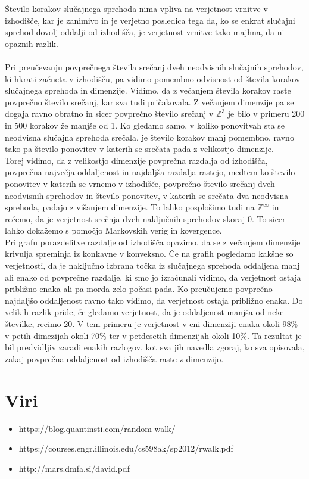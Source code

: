\documentclass[a4paper,oneside,12pt]{article}
\begin{document}
Število korakov slučajnega sprehoda nima vpliva na verjetnost vrnitve v izhodišče, kar je zanimivo in je verjetno posledica tega da, ko se enkrat slučajni sprehod dovolj oddalji od izhodišča, je verjetnost vrnitve tako majhna, da ni opaznih razlik. \\
\\
Pri preučevanju povprečnega števila srečanj dveh neodvisnih slučajnih sprehodov, ki hkrati začneta v izhodišču, pa vidimo pomembno odvisnost od števila korakov slučajnega sprehoda in dimenzije. Vidimo, da z večanjem števila korakov raste povprečno število srečanj, kar sva tudi pričakovala. Z večanjem dimenzije pa se dogaja ravno obratno in sicer povprečno število srečanj v $\mathbb{Z}^3$ je bilo v primeru 200 in 500 korakov že manjše od 1. Ko gledamo samo, v koliko ponovitvah sta se neodvisna slučajna sprehoda srečala, je število korakov manj pomembno, ravno tako pa število ponovitev v katerih se srečata pada z velikostjo dimenzije. \\
Torej vidimo, da z velikostjo dimenzije povprečna razdalja od izhodišča, povprečna največja oddaljenost in najdaljša razdalja rastejo, medtem ko število ponovitev v katerih se vrnemo v izhodišče, povprečno število srečanj dveh neodvisnih sprehodov in število ponovitev, v katerih se srečata dva neodvisna sprehoda, padajo z višanjem dimenzije. To lahko posplošimo tudi na $\mathbb{Z}^\infty$ in rečemo, da je verjetnost srečnja dveh naključnih sprehodov skoraj 0. To sicer lahko dokažemo s pomočjo Markovskih verig in kovergence. \\


Pri grafu porazdelitve razdalje od izhodišča opazimo, da se z večanjem dimenzije krivulja spreminja iz konkavne v konveksno. Če na grafih pogledamo kakšne so verjetnosti, da je naključno izbrana točka iz slučajnega sprehoda oddaljena manj ali enako od povprečne razdalje, ki smo jo izračunali vidimo, da verjetnost ostaja približno enaka ali pa morda zelo počasi pada.
Ko preučujemo povprečno najdaljšo oddaljenost ravno tako vidimo, da verjetnost ostaja približno enaka. Do velikih razlik pride, če gledamo verjetnost, da je oddaljenost manjša od neke številke, recimo 20. V tem primeru je verjetnost v eni dimenziji enaka 
okoli 98\% v petih dimezijah okoli 70\% ter v petdesetih dimenzijah okoli 10\%. Ta rezultat je bil predvidljiv zaradi enakih razlogov, kot sva jih navedla zgoraj, ko sva opisovala, zakaj povprečna oddaljenost od izhodišča raste z dimenzijo.
\newpage

\section{Viri}
\begin{itemize}
\item https://blog.quantinsti.com/random-walk/ 
\item https://courses.engr.illinois.edu/cs598ak/sp2012/rwalk.pdf
\item http://mars.dmfa.si/david.pdf 
\end{itemize}
\end{document}
